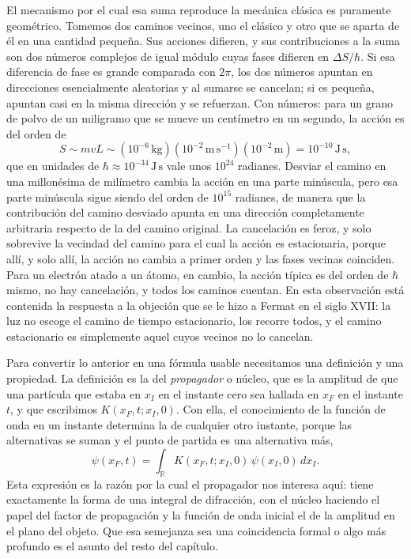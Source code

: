         El mecanismo por el cual esa suma reproduce la mecánica clásica es puramente geométrico. Tomemos dos caminos vecinos, uno el clásico y otro que se aparta de él en una cantidad pequeña. Sus acciones difieren, y sus contribuciones a la suma son dos números complejos de igual módulo cuyas fases difieren en $\Delta S/\hbar$. Si esa diferencia de fase es grande comparada con $2\pi$, los dos números apuntan en direcciones esencialmente aleatorias y al sumarse se cancelan; si es pequeña, apuntan casi en la misma dirección y se refuerzan. Con números: para un grano de polvo de un miligramo que se mueve un centímetro en un segundo, la acción es del orden de
        \begin{equation}\label{eq:EstimacionClasica}
            S \sim m v L \sim \left(10^{-6}\,\mathrm{kg}\right)\left(10^{-2}\,\mathrm{m\,s^{-1}}\right)\left(10^{-2}\,\mathrm{m}\right) = 10^{-10}\,\mathrm{J\,s},
        \end{equation}
        que en unidades de $\hbar\approx 10^{-34}\,\mathrm{J\,s}$ vale unos $10^{24}$ radianes. Desviar el camino en una millonésima de milímetro cambia la acción en una parte minúscula, pero esa parte minúscula sigue siendo del orden de $10^{15}$ radianes, de manera que la contribución del camino desviado apunta en una dirección completamente arbitraria respecto de la del camino original. La cancelación es feroz, y solo sobrevive la vecindad del camino para el cual la acción es estacionaria, porque allí, y solo allí, la acción no cambia a primer orden y las fases vecinas coinciden. Para un electrón atado a un átomo, en cambio, la acción típica es del orden de $\hbar$ mismo, no hay cancelación, y todos los caminos cuentan. En esta observación está contenida la respuesta a la objeción que se le hizo a Fermat en el siglo XVII: la luz no escoge el camino de tiempo estacionario, los recorre todos, y el camino estacionario es simplemente aquel cuyos vecinos no lo cancelan.

        Para convertir lo anterior en una fórmula usable necesitamos una definición y una propiedad. La definición es la del \textit{propagador} o núcleo, que es la amplitud de que una partícula que estaba en $x_{I}$ en el instante cero sea hallada en $x_{F}$ en el instante $t$, y que escribimos $K(x_{F},t;x_{I},0)$. Con ella, el conocimiento de la función de onda en un instante determina la de cualquier otro instante, porque las alternativas se suman y el punto de partida es una alternativa más,
        \begin{equation}\label{eq:EvolucionK}
            \psi(x_{F},t) = \int_{\mathbb{R}} K(x_{F},t;x_{I},0)\,\psi(x_{I},0)\,dx_{I} .
        \end{equation}
        Esta expresión es la razón por la cual el propagador nos interesa aquí: tiene exactamente la forma de una integral de difracción, con el núcleo haciendo el papel del factor de propagación y la función de onda inicial el de la amplitud en el plano del objeto. Que esa semejanza sea una coincidencia formal o algo más profundo es el asunto del resto del capítulo.

